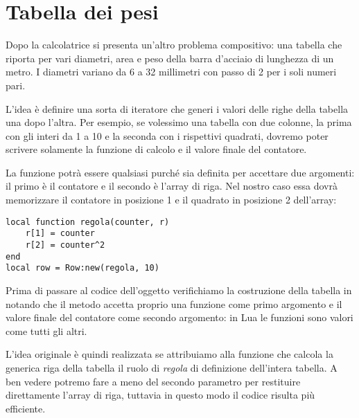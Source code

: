 

\section{Tabella dei pesi}

Dopo la calcolatrice si presenta un'altro problema compositivo: una tabella che
riporta per vari diametri, area e peso della barra d'acciaio di lunghezza di un
metro. I diametri variano da 6 a 32 millimetri con passo di 2 per i soli numeri
pari. 

L'idea è definire una sorta di iteratore che generi i valori delle righe della
tabella una dopo l'altra. Per esempio, se volessimo una tabella con due colonne,
la prima con gli interi da 1 a 10 e la seconda con i rispettivi quadrati,
dovremo poter scrivere solamente la funzione di calcolo e il valore finale del
contatore.

La funzione potrà essere qualsiasi purché sia definita per accettare due
argomenti: il primo è il contatore e il secondo è l'array di riga. Nel nostro
caso essa dovrà memorizzare il contatore in posizione 1 e il quadrato in
posizione 2 dell'array:
\begin{Verbatim}
local function regola(counter, r)
    r[1] = counter
    r[2] = counter^2
end
local row = Row:new(regola, 10)
\end{Verbatim}

Prima di passare al codice dell'oggetto  verifichiamo la costruzione
della tabella in \LuaLaTeX{} notando che il metodo  accetta proprio una
funzione come primo argomento e il valore finale del contatore come secondo
argomento: in Lua le funzioni sono valori come tutti gli altri.

L'idea originale è quindi realizzata se attribuiamo alla funzione che calcola la
generica riga della tabella il ruolo di \emph{regola} di definizione dell'intera
tabella. A ben vedere potremo fare a meno del secondo parametro per restituire
direttamente l'array di riga, tuttavia in questo modo il codice risulta più
efficiente.


